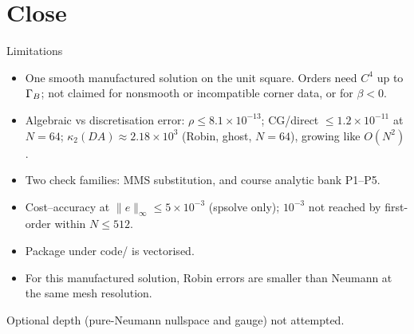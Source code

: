 \documentclass[aspectratio=169,8pt,t]{beamer}
\begin{document}
\section{Close}
\begin{frame}{Limitations}
\bodytop
\begin{itemize}\setlength{\itemsep}{\blockskip}
\item One smooth manufactured solution on the unit square. Orders need $C^4$ up to $\Gamma_B$; not claimed for nonsmooth or incompatible corner data, or for $\beta<0$.
\item Algebraic vs discretisation error: $\rho\le8.1\times10^{-13}$; CG/direct $\le1.2\times10^{-11}$ at $N=64$; $\kappa_2(DA)\approx2.18\times10^3$ (Robin, ghost, $N=64$), growing like $O(N^2)$.
\item Two check families: MMS substitution, and course analytic bank P1--P5.
\item Cost--accuracy at $\|e\|_\infty\le5\times10^{-3}$ (\textrm{spsolve} only); $10^{-3}$ not reached by first-order within $N\le512$.
\item Package under \textrm{code/} is vectorised.
\item For this manufactured solution, Robin errors are smaller than Neumann at the same mesh resolution.
\end{itemize}
\closing{Optional depth (pure-Neumann nullspace and gauge) not attempted.}
\end{frame}
\end{document}
